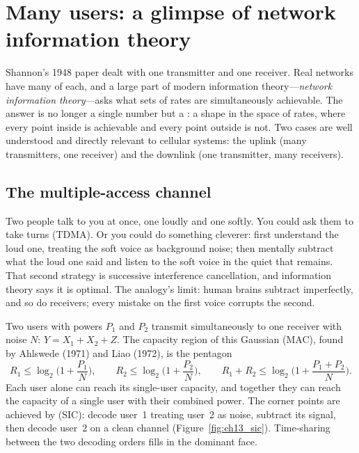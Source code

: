 \section{Many users: a glimpse of network information theory}
\label{sec:ch13:multiuser}

Shannon's 1948 paper dealt with one transmitter and one receiver. Real networks have many of each,
and a large part of modern information theory---\emph{network information theory}---asks what sets
of rates are simultaneously achievable. The answer is no longer a single number but a
: a shape in the space of rates, where every point inside is achievable and
every point outside is not. Two cases are well understood and directly relevant to cellular
systems: the uplink (many transmitters, one receiver) and the downlink (one transmitter, many
receivers).


\subsection{The multiple-access channel}

\begin{analogy}
Two people talk to you at once, one loudly and one softly. You could ask them to take turns
(TDMA). Or you could do something cleverer: first understand the loud one, treating the soft voice
as background noise; then mentally subtract what the loud one said and listen to the soft voice
in the quiet that remains. That second strategy is successive interference cancellation, and
information theory says it is optimal. The analogy's limit: human brains subtract imperfectly, and
so do receivers; every mistake on the first voice corrupts the second.
\end{analogy}

Two users with powers $P_1$ and $P_2$ transmit simultaneously to one receiver with noise $N$:
$Y=X_1+X_2+Z$. The capacity region of this Gaussian  (MAC), found by
Ahlswede (1971) and Liao (1972), is the pentagon
\begin{equation}
R_1\le\log_2\!\Big(1+\frac{P_1}N\Big),\qquad
R_2\le\log_2\!\Big(1+\frac{P_2}N\Big),\qquad
R_1+R_2\le\log_2\!\Big(1+\frac{P_1+P_2}N\Big).
\label{eq:ch13:mac}
\end{equation}
Each user alone can reach its single-user capacity, and together they can reach the capacity of a
single user with their combined power. The corner points are achieved by  (SIC): decode user~1 treating user~2 as noise, subtract its signal, then
decode user~2 on a clean channel (Figure~\ref{fig:ch13_sic}). Time-sharing between the two
decoding orders fills in the dominant face.

